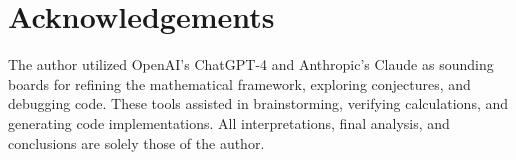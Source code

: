 \section*{Acknowledgements}
The author utilized OpenAI’s ChatGPT-4 and Anthropic’s Claude as sounding boards for
refining the mathematical framework, exploring conjectures, and debugging code. These
tools assisted in brainstorming, verifying calculations, and generating code implementations.
All interpretations, final analysis, and conclusions are solely those of the author.
